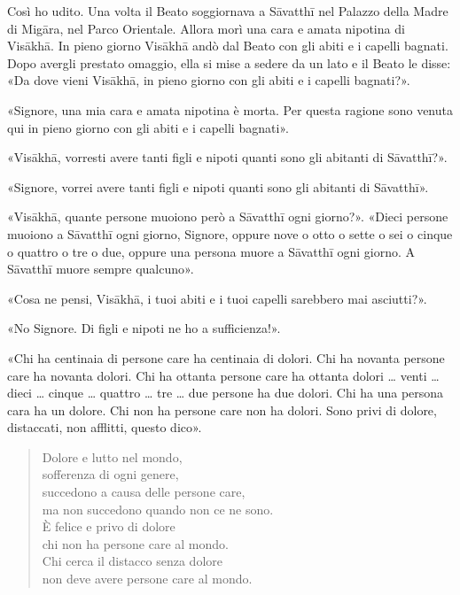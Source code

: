 
 Così ho udito. Una volta il Beato soggiornava a Sāvatthī nel
Palazzo della Madre di Migāra, nel Parco Orientale. Allora morì una cara e amata
nipotina di Visākhā. In pieno giorno Visākhā andò dal Beato con gli abiti e i
capelli bagnati. Dopo avergli prestato omaggio, ella si mise a sedere da un lato
e il Beato le disse: «Da dove vieni Visākhā, in pieno giorno con gli abiti e i
capelli bagnati?».

«Signore, una mia cara e amata nipotina è morta. Per questa ragione sono venuta
qui in pieno giorno con gli abiti e i capelli bagnati».

«Visākhā, vorresti avere tanti figli e nipoti quanti sono gli abitanti di
Sāvatthī?».

«Signore, vorrei avere tanti figli e nipoti quanti sono gli abitanti di
Sāvatthī».

«Visākhā, quante persone muoiono però a Sāvatthī ogni giorno?». «Dieci persone
muoiono a Sāvatthī ogni giorno, Signore, oppure nove o otto o sette o sei o
cinque o quattro o tre o due, oppure una persona muore a Sāvatthī ogni giorno. A
Sāvatthī muore sempre qualcuno».

«Cosa ne pensi, Visākhā, i tuoi abiti e i tuoi capelli sarebbero mai asciutti?».

«No Signore. Di figli e nipoti ne ho a sufficienza!».

«Chi ha centinaia di persone care ha centinaia di dolori. Chi ha novanta persone
care ha novanta dolori. Chi ha ottanta persone care ha ottanta dolori … venti …
dieci … cinque … quattro … tre … due persone ha due dolori. Chi ha una persona
cara ha un dolore. Chi non ha persone care non ha dolori. Sono privi di dolore,
distaccati, non afflitti, questo dico».

\begin{quote}
Dolore e lutto nel mondo, \\
sofferenza di ogni genere, \\
succedono a causa delle persone care, \\
ma non succedono quando non ce ne sono. \\
È felice e privo di dolore \\
chi non ha persone care al mondo. \\
Chi cerca il distacco senza dolore \\
non deve avere persone care al mondo.
\end{quote}


